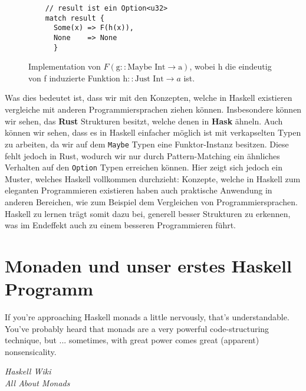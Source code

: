 \documentclass{hhuarticle}
\theoremstyle{definition}
\theoremstyle{theorem}
\begin{document}
  \begin{figure}[h]
    \begin{verbatim}
    // result ist ein Option<u32>
    match result {
      Some(x) => F(h(x)),
      None    => None
      }
    \end{verbatim}
    \caption{Implementation von $F(\text{g} :: \text{Maybe Int} \to \text{a})$, wobei h die eindeutig von f induzierte Funktion $\text{h} :: \text{Just Int} \to a$ ist.}%
    \label{fig:OptionFunktor}
  \end{figure}

  Was dies bedeutet ist, dass wir mit den Konzepten, welche in Haskell
  existieren vergleiche mit anderen Programmiersprachen ziehen können.
  Insbesondere können wir sehen, das \textbf{Rust} Strukturen
  besitzt, welche denen in \textbf{Hask} ähneln. Auch können wir sehen,
  dass es in Haskell einfacher möglich ist mit verkapselten Typen zu
  arbeiten, da wir auf dem \verb|Maybe| Typen eine Funktor-Instanz
  besitzen. Diese fehlt jedoch in Rust, wodurch wir nur durch Pattern-Matching
  ein ähnliches Verhalten auf den \verb|Option| Typen erreichen können.
  Hier zeigt sich jedoch ein Muster, welches Haskell vollkommen durchzieht:
  Konzepte, welche in Haskell zum eleganten Programmieren existieren
  haben auch praktische Anwendung in anderen Bereichen, wie zum Beispiel
  dem Vergleichen von Programmiersprachen. Haskell zu lernen trägt somit
  dazu bei, generell besser Strukturen zu erkennen, was im Endeffekt
  auch zu einem besseren Programmieren führt.

  \section{Monaden und unser erstes Haskell Programm}

  \epigraph{
    If you're approaching Haskell monads a little nervously, that's understandable. You've probably heard that monads are a very powerful code-structuring technique, but ... sometimes, with great power comes great (apparent) nonsensicality.
  }{\textit{Haskell Wiki \\ All About Monads}}
\end{document}
